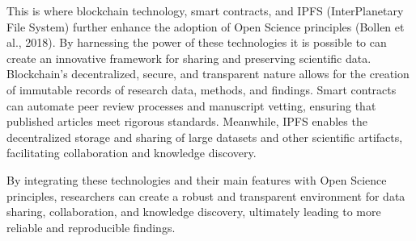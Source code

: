 This is where blockchain technology, smart contracts, and IPFS (InterPlanetary File System) further enhance the adoption of Open Science principles (Bollen et al., 2018). By harnessing the power of these technologies it is possible to can create an innovative framework for sharing and preserving scientific data. Blockchain's decentralized, secure, and transparent nature allows for the creation of immutable records of research data, methods, and findings. Smart contracts can automate peer review processes and manuscript vetting, ensuring that published articles meet rigorous standards. Meanwhile, IPFS enables the decentralized storage and sharing of large datasets and other scientific artifacts, facilitating collaboration and knowledge discovery.

By integrating these technologies and their main features with Open Science principles, researchers can create a robust and transparent environment for data sharing, collaboration, and knowledge discovery, ultimately leading to more reliable and reproducible findings.




